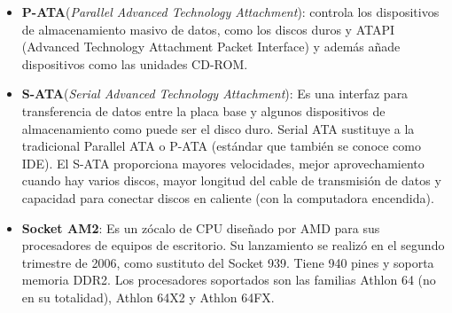 \begin{itemize}
\item \textbf{P-ATA}(\textit{Parallel Advanced Technology Attachment}): controla los
 dispositivos de almacenamiento masivo de datos, como los discos duros y ATAPI 
(Advanced Technology Attachment Packet Interface) y además añade dispositivos como 
las unidades CD-ROM.

\item \textbf{S-ATA}(\textit{Serial Advanced Technology Attachment}): Es una interfaz
para transferencia de datos entre la placa base y algunos dispositivos de
almacenamiento como puede ser el disco duro. Serial ATA sustituye a la
tradicional Parallel ATA o P-ATA (estándar que también se conoce como IDE). El
S-ATA proporciona mayores velocidades, mejor aprovechamiento cuando hay varios
discos, mayor longitud del cable de transmisión de datos y capacidad para
conectar discos en caliente (con la computadora encendida).

\item \textbf{Socket AM2}: Es un zócalo de CPU diseñado por AMD para sus
procesadores de equipos de escritorio. Su lanzamiento se realizó en el segundo
trimestre de 2006, como sustituto del Socket 939. Tiene 940 pines y soporta
memoria DDR2. Los procesadores soportados son las familias Athlon 64 (no en su totalidad), Athlon 64X2
y Athlon 64FX.


\end{itemize}
